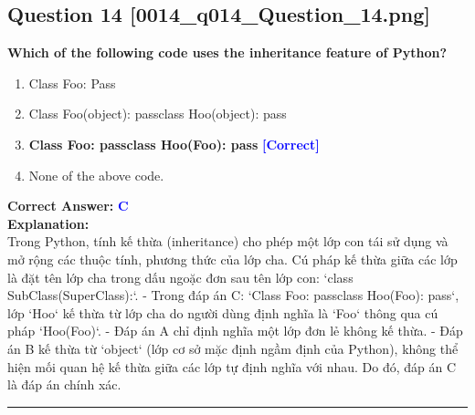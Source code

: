 \documentclass[11pt,a4paper]{article}
\begin{document}
\begin{minipage}{\textwidth}
\subsection*{Question 14 \quad \footnotesize{[0014_q014_Question_14.png]}}
\noindent \textbf{Which of the following code uses the inheritance feature of Python?}

\begin{enumerate}[label=\Alph*.]
    \item Class Foo: Pass
    \item Class Foo(object): passclass Hoo(object): pass
    \item \textbf{Class Foo: passclass Hoo(Foo): pass} \hfill \textcolor{blue}{\textbf{[Correct]}}
    \item None of the above code.
\end{enumerate}

\noindent \textbf{Correct Answer:} \textcolor{blue}{\textbf{C}} \\[4pt]
\noindent \textbf{Explanation:}\\
Trong Python, tính kế thừa (inheritance) cho phép một lớp con tái sử dụng và mở rộng các thuộc tính, phương thức của lớp cha. Cú pháp kế thừa giữa các lớp là đặt tên lớp cha trong dấu ngoặc đơn sau tên lớp con: `class SubClass(SuperClass):`.\newline
- Trong đáp án C: `Class Foo: passclass Hoo(Foo): pass`, lớp `Hoo` kế thừa từ lớp cha do người dùng định nghĩa là `Foo` thông qua cú pháp `Hoo(Foo)`.\newline
- Đáp án A chỉ định nghĩa một lớp đơn lẻ không kế thừa.\newline
- Đáp án B kế thừa từ `object` (lớp cơ sở mặc định ngầm định của Python), không thể hiện mối quan hệ kế thừa giữa các lớp tự định nghĩa với nhau.\newline
Do đó, đáp án C là đáp án chính xác.
\end{minipage}
\vspace{0.8cm}
\hrule
\vspace{0.5cm}
\end{document}
